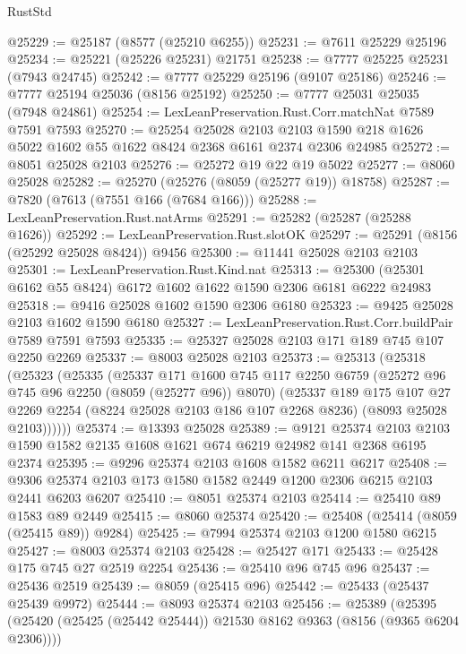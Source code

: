 \begin{lexlean}{RustStd}
\begin{coremodule}
@25229 := @25187 (@8577 (@25210 @6255))
@25231 := @7611 @25229 @25196
@25234 := @25221 (@25226 @25231) @21751
@25238 := @7777 @25225 @25231 (@7943 @24745)
@25242 := @7777 @25229 @25196 (@9107 @25186)
@25246 := @7777 @25194 @25036 (@8156 @25192)
@25250 := @7777 @25031 @25035 (@7948 @24861)
@25254 := LexLeanPreservation.Rust.Corr.matchNat @7589 @7591 @7593
@25270 := @25254
    @25028
    @2103
    @2103
    @1590
    @218
    @1626
    @5022
    @1602
    @55
    @1622
    @8424
    @2368
    @6161
    @2374
    @2306
    @24985
@25272 := @8051 @25028 @2103
@25276 := @25272 @19 @22 @19 @5022
@25277 := @8060 @25028
@25282 := @25270 (@25276 (@8059 (@25277 @19)) @18758)
@25287 := @7820 (@7613 (@7551 @166 (@7684 @166)))
@25288 := LexLeanPreservation.Rust.natArms
@25291 := @25282 (@25287 (@25288 @1626))
@25292 := LexLeanPreservation.Rust.slotOK
@25297 := @25291 (@8156 (@25292 @25028 @8424)) @9456
@25300 := @11441 @25028 @2103 @2103
@25301 := LexLeanPreservation.Rust.Kind.nat
@25313 := @25300 (@25301 @6162 @55 @8424) @6172 @1602 @1622 @1590 @2306 @6181 @6222 @24983
@25318 := @9416 @25028 @1602 @1590 @2306 @6180
@25323 := @9425 @25028 @2103 @1602 @1590 @6180
@25327 := LexLeanPreservation.Rust.Corr.buildPair @7589 @7591 @7593
@25335 := @25327 @25028 @2103 @171 @189 @745 @107 @2250 @2269
@25337 := @8003 @25028 @2103
@25373 := @25313
    (@25318
      (@25323
        (@25335
          (@25337
            @171
            @1600
            @745
            @117
            @2250
            @6759
            (@25272 @96 @745 @96 @2250 (@8059 (@25277 @96)) @8070)
            (@25337
              @189
              @175
              @107
              @27
              @2269
              @2254
              (@8224 @25028 @2103 @186 @107 @2268 @8236)
              (@8093 @25028 @2103))))))
@25374 := @13393 @25028
@25389 := @9121
    @25374
    @2103
    @2103
    @1590
    @1582
    @2135
    @1608
    @1621
    @674
    @6219
    @24982
    @141
    @2368
    @6195
    @2374
@25395 := @9296 @25374 @2103 @1608 @1582 @6211 @6217
@25408 := @9306 @25374 @2103 @173 @1580 @1582 @2449 @1200 @2306 @6215 @2103 @2441 @6203 @6207
@25410 := @8051 @25374 @2103
@25414 := @25410 @89 @1583 @89 @2449
@25415 := @8060 @25374
@25420 := @25408 (@25414 (@8059 (@25415 @89)) @9284)
@25425 := @7994 @25374 @2103 @1200 @1580 @6215
@25427 := @8003 @25374 @2103
@25428 := @25427 @171
@25433 := @25428 @175 @745 @27 @2519 @2254
@25436 := @25410 @96 @745 @96
@25437 := @25436 @2519
@25439 := @8059 (@25415 @96)
@25442 := @25433 (@25437 @25439 @9972)
@25444 := @8093 @25374 @2103
@25456 := @25389
    (@25395 (@25420 (@25425 (@25442 @25444)) @21530 @8162 @9363 (@8156 (@9365 @6204 @2306))))

\end{coremodule}
\end{lexlean}
